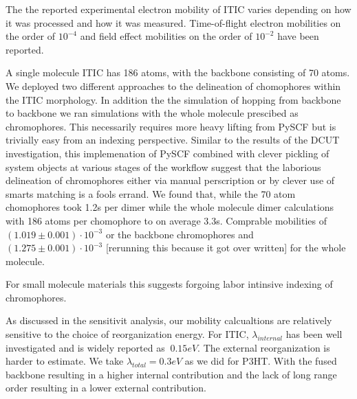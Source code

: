 The the reported
experimental electron mobility of ITIC varies depending on how it was processed and how it was measured. Time-of-flight electron mobilities on the order of $10^{-4}$ \cite{Mica2018} and field effect mobilities on the order of
$10^{-2}$ \cite{Park2018} have been reported. 

A single molecule ITIC has 186 atoms, with the backbone consisting of 70 atoms. We deployed two different
approaches to the delineation of chomophores within the ITIC morphology. In addition the the simulation of hopping
from backbone to backbone we ran simulations with the whole molecule prescibed as chromophores. This
necessarily requires more heavy lifting from PySCF but is trivially easy from an indexing perspective. Similar to the results of the DCUT
investigation, this implemenation of PySCF combined with clever pickling of system objects at various stages
of the workflow suggest that the laborious delineation of chromophores either via manual perscription or
by clever use of smarts matching is a fools errand. We found that, while the 70 atom chomophores took 1.2s
per dimer while the whole molecule dimer calculations with 186 atoms per chomophore to on average 3.3s.
Comprable mobilities of $(1.019 \pm 0.001)\cdot 10^{-3}$ or the backbone chromophores and 
$(1.275 \pm 0.001)\cdot 10^{-3}$ [rerunning this because it got over written] for the whole molecule. 

For small molecule materials this suggests forgoing labor intinsive indexing of chromophores.

As discussed in the sensitivit analysis, our mobility calcualtions are relatively sensitive to the choice of
reorganization energy. For ITIC, $\lambda_{internal}$ has been well investigated and is widely reported as
$~0.15eV$. The external reorganization is harder to estimate. We take $\lambda_{total}=0.3eV$ as we did for
P3HT. With the fused
backbone resulting in a higher internal contribution and the lack of long range order resulting in a lower
external contribution. 

